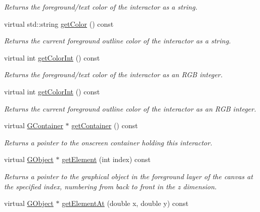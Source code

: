 \begin{DoxyCompactItemize}
\begin{DoxyCompactList}\small\item\em Returns the foreground/text color of the interactor as a string. \end{DoxyCompactList}\item 
virtual std\+::string \mbox{\hyperlink{classsgl_1_1GDrawingSurface_aa061dfa488c31e18549d64363c1d0e34}{get\+Color}} () const
\begin{DoxyCompactList}\small\item\em Returns the current foreground outline color of the interactor as a string. \end{DoxyCompactList}\item 
virtual int \mbox{\hyperlink{classsgl_1_1GInteractor_a9635c7af766cdc3417f346683fa0e6c1}{get\+Color\+Int}} () const
\begin{DoxyCompactList}\small\item\em Returns the foreground/text color of the interactor as an R\+GB integer. \end{DoxyCompactList}\item 
virtual int \mbox{\hyperlink{classsgl_1_1GDrawingSurface_a9635c7af766cdc3417f346683fa0e6c1}{get\+Color\+Int}} () const
\begin{DoxyCompactList}\small\item\em Returns the current foreground outline color of the interactor as an R\+GB integer. \end{DoxyCompactList}\item 
virtual \mbox{\hyperlink{classsgl_1_1GContainer}{G\+Container}} $\ast$ \mbox{\hyperlink{classsgl_1_1GInteractor_a7a6e317c29d61030929b4cd2d1c00fe7}{get\+Container}} () const
\begin{DoxyCompactList}\small\item\em Returns a pointer to the onscreen container holding this interactor. \end{DoxyCompactList}\item 
virtual \mbox{\hyperlink{classsgl_1_1GObject}{G\+Object}} $\ast$ \mbox{\hyperlink{classsgl_1_1GCanvas_abde388cc529d22bb5f7f4a54d56049d8}{get\+Element}} (int index) const
\begin{DoxyCompactList}\small\item\em Returns a pointer to the graphical object in the foreground layer of the canvas at the specified index, numbering from back to front in the {\itshape z} dimension. \end{DoxyCompactList}\item 
virtual \mbox{\hyperlink{classsgl_1_1GObject}{G\+Object}} $\ast$ \mbox{\hyperlink{classsgl_1_1GCanvas_a25efa999eca5790ec26ef091b05f961c}{get\+Element\+At}} (double x, double y) const

\end{DoxyCompactItemize}
